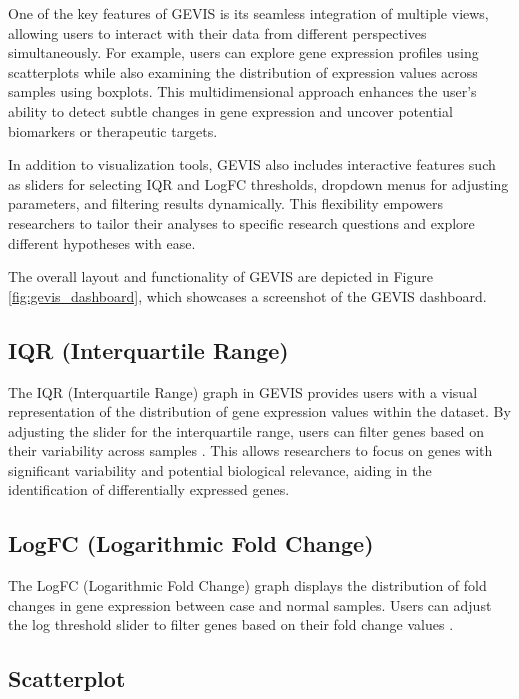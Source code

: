 \documentclass[
	a4paper, %
	10pt, %
	unnumberedsections, %
	twoside, %
]{LTJournalArticle}
\begin{document}
One of the key features of GEVIS is its seamless integration of multiple views, allowing users to interact with their data from different perspectives simultaneously. For example, users can explore gene expression profiles using scatterplots while also examining the distribution of expression values across samples using boxplots. This multidimensional approach enhances the user's ability to detect subtle changes in gene expression and uncover potential biomarkers or therapeutic targets.

In addition to visualization tools, GEVIS also includes interactive features such as sliders for selecting IQR and LogFC thresholds, dropdown menus for adjusting parameters, and filtering results dynamically. This flexibility empowers researchers to tailor their analyses to specific research questions and explore different hypotheses with ease.

The overall layout and functionality of GEVIS are depicted in Figure \ref{fig:gevis_dashboard}, which showcases a screenshot of the GEVIS dashboard.

\subsection{IQR (Interquartile Range)}

The IQR (Interquartile Range) graph in GEVIS provides users with a visual representation of the distribution of gene expression values within the dataset. By adjusting the slider for the interquartile range, users can filter genes based on their variability across samples \cite{chockalingam2016microarray}. This allows researchers to focus on genes with significant variability and potential biological relevance, aiding in the identification of differentially expressed genes.

\subsection{LogFC (Logarithmic Fold Change)}

The LogFC (Logarithmic Fold Change) graph displays the distribution of fold changes in gene expression between case and normal samples. Users can adjust the log threshold slider to filter genes based on their fold change values \cite{mccarthy2009testing}.

\subsection{Scatterplot}
\end{document}
